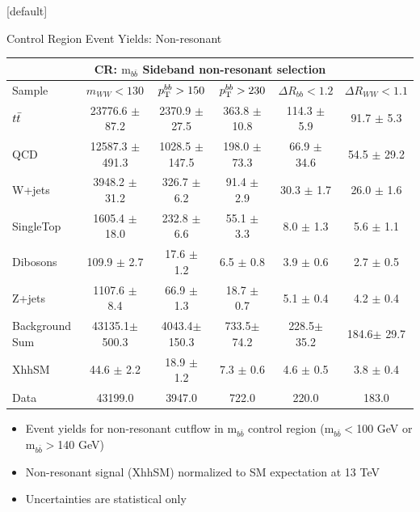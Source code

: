 \documentclass{beamer}
\newcommand*{\ttbar}{\ensuremath{\lowercase{t\bar{t}}}\xspace}
\newcommand*{\mbb}{\ensuremath{\text{m}_{b\bar{b}}}\xspace}
\begin{document}
{\makeatletter %
  [default]
  \def\beamer@entrycode{\vspace*{-1.075\headheight}}
  \begin{frame}{Control Region Event Yields: Non-resonant}
    \begin{table}
      \begin{adjustbox}{width=1\textwidth}
        \begin{tabular}{l|c|c|c|c|c}
          \hline\hline
          \multicolumn{6}{c}{\textbf{CR}: \mbb Sideband non-resonant selection}\\\hline\hline
          Sample  	& $m_{WW}<130$ 	& $p_{\rm T}^{bb}>150$ 	& $p_{\rm T}^{bb}>230$ 	& $\Delta R_{bb}<1.2$  	& $\Delta R_{WW} <1.1$   \\\hline
          \ttbar 	& 23776.6 $\pm$ 87.2 	& 2370.9 $\pm$ 27.5 	& 363.8 $\pm$ 10.8 	& 114.3 $\pm$ 5.9 	& 91.7 $\pm$ 5.3 	\\\hline 
          QCD 	& 12587.3 $\pm$ 491.3 	& 1028.5 $\pm$ 147.5 	& 198.0 $\pm$ 73.3 	& 66.9 $\pm$ 34.6 	& 54.5 $\pm$ 29.2 \\\hline 
          W+jets 	& 3948.2 $\pm$ 31.2 	& 326.7 $\pm$ 6.2 	& 91.4 $\pm$ 2.9 	& 30.3 $\pm$ 1.7 	& 26.0 $\pm$ 1.6 	\\\hline 
          SingleTop 	& 1605.4 $\pm$ 18.0 	& 232.8 $\pm$ 6.6 	& 55.1 $\pm$ 3.3 	& 8.0 $\pm$ 1.3 	& 5.6 $\pm$ 1.1 		\\\hline 
          Dibosons 	& 109.9 $\pm$ 2.7 	& 17.6 $\pm$ 1.2 	& 6.5 $\pm$ 0.8 	& 3.9 $\pm$ 0.6 	& 2.7 $\pm$ 0.5 		\\\hline 
          Z+jets 	& 1107.6 $\pm$ 8.4 	& 66.9 $\pm$ 1.3 	& 18.7 $\pm$ 0.7 	& 5.1 $\pm$ 0.4 	& 4.2 $\pm$ 0.4 	\\\hline 
          \hline
          Background Sum 	& 43135.1$\pm$ 500.3 	& 4043.4$\pm$ 150.3 	& 733.5$\pm$ 74.2 	& 228.5$\pm$ 35.2 	& 184.6$\pm$ 29.7 	\\\hline 
          \hline
          XhhSM 	& 44.6 $\pm$ 2.2 	& 18.9 $\pm$ 1.2 	& 7.3 $\pm$ 0.6 	& 4.6 $\pm$ 0.5 	& 3.8 $\pm$ 0.4 	\\\hline 
          Data 	& 43199.0 	& 3947.0 	& 722.0 	& 220.0 	& 183.0 	\\\hline 
          \hline
        \end{tabular}
        \label{tab:CR1}
      \end{adjustbox}
    \end{table}
    \begin{itemize}
    \item Event yields for non-resonant cutflow in \mbb control region (\mbb$<$100 GeV or \mbb$>$140 GeV)
    \item Non-resonant signal (XhhSM) normalized to SM expectation at 13 TeV
    \item Uncertainties are statistical only
    \end{itemize}
  \end{frame}

}
\end{document}
